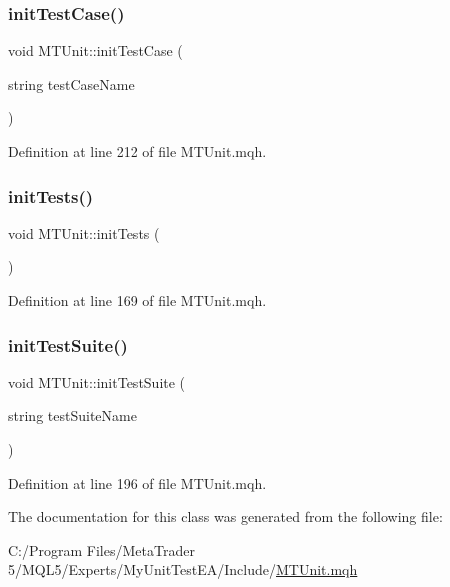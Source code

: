 \mbox{\label{class_m_t_unit_a1e7cb46dba78294140e278e9ef61de1e}} 
\subsubsection{\texorpdfstring{init\+Test\+Case()}{initTestCase()}}
{\footnotesize\ttfamily void M\+T\+Unit\+::init\+Test\+Case (\begin{DoxyParamCaption}\item[{string}]{test\+Case\+Name }\end{DoxyParamCaption})}



Definition at line 212 of file M\+T\+Unit.\+mqh.

\mbox{\label{class_m_t_unit_ac5ad32a3325f61ce9accab32d56ca1d4}} 
\subsubsection{\texorpdfstring{init\+Tests()}{initTests()}}
{\footnotesize\ttfamily void M\+T\+Unit\+::init\+Tests (\begin{DoxyParamCaption}{ }\end{DoxyParamCaption})}



Definition at line 169 of file M\+T\+Unit.\+mqh.

\mbox{\label{class_m_t_unit_a29ea187d53e25eb84ea688312e3d737e}} 
\subsubsection{\texorpdfstring{init\+Test\+Suite()}{initTestSuite()}}
{\footnotesize\ttfamily void M\+T\+Unit\+::init\+Test\+Suite (\begin{DoxyParamCaption}\item[{string}]{test\+Suite\+Name }\end{DoxyParamCaption})}



Definition at line 196 of file M\+T\+Unit.\+mqh.



The documentation for this class was generated from the following file\+:\begin{DoxyCompactItemize}
\item 
C\+:/\+Program Files/\+Meta\+Trader 5/\+M\+Q\+L5/\+Experts/\+My\+Unit\+Test\+E\+A/\+Include/\mbox{\hyperlink{_m_t_unit_8mqh}{M\+T\+Unit.\+mqh}}\end{DoxyCompactItemize}
